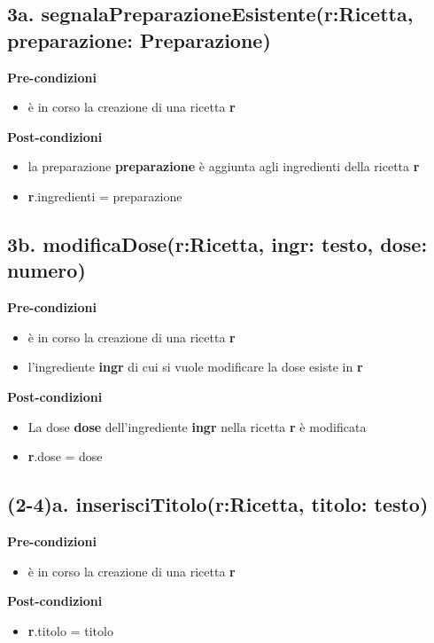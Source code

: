 \documentclass[12pt]{extarticle}
\begin{document}
\subsection*{3a. segnalaPreparazioneEsistente(r:Ricetta, preparazione: Preparazione)}

\textbf{Pre-condizioni}
\begin{itemize}
  \item è in corso la creazione di una ricetta  \textbf{r}
\end{itemize}
\textbf{Post-condizioni}
\begin{itemize}
  \item la preparazione  \textbf{preparazione} è aggiunta agli ingredienti della ricetta  \textbf{r}
  \item \textbf{r}.ingredienti = preparazione
\end{itemize}

\subsection*{3b. modificaDose(r:Ricetta, ingr: testo, dose: numero)}

\textbf{Pre-condizioni}
\begin{itemize}
  \item è in corso la creazione di una ricetta  \textbf{r}
  \item l'ingrediente \textbf{ingr} di cui si vuole modificare la dose esiste in \textbf{r}
\end{itemize}
\textbf{Post-condizioni}
\begin{itemize}
  \item La dose \textbf{dose} dell'ingrediente \textbf{ingr} nella ricetta \textbf{r} è modificata
  \item \textbf{r}.dose = dose
\end{itemize}

\subsection*{(2-4)a. inserisciTitolo(r:Ricetta, titolo: testo)}

\textbf{Pre-condizioni}
\begin{itemize}
  \item è in corso la creazione di una ricetta  \textbf{r}
\end{itemize}
\textbf{Post-condizioni}
\begin{itemize}
  \item \textbf{r}.titolo = titolo
\end{itemize}
\end{document}
